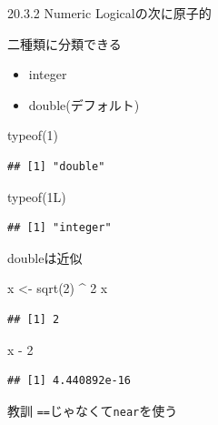 \documentclass[
  ignorenonframetext,
]{beamer}
\newenvironment{Shaded}{\begin{snugshade}}{\end{snugshade}}
\newcommand{\DecValTok}[1]{\textcolor[rgb]{0.00,0.00,0.81}{#1}}
\newcommand{\FunctionTok}[1]{\textcolor[rgb]{0.00,0.00,0.00}{#1}}
\newcommand{\NormalTok}[1]{#1}
\newcommand{\OtherTok}[1]{\textcolor[rgb]{0.56,0.35,0.01}{#1}}
\newcommand{\SpecialCharTok}[1]{\textcolor[rgb]{0.00,0.00,0.00}{#1}}
\providecommand{\tightlist}{%
  \setlength{\itemsep}{0pt}\setlength{\parskip}{0pt}}
\begin{document}
\begin{frame}[fragile]{20.3.2 Numeric}
\protect\hypertarget{numeric}{}
Logicalの次に原子的

二種類に分類できる

\begin{itemize}
\tightlist
\item
  integer
\item
  double(デフォルト)
\end{itemize}

\begin{Shaded}
\begin{Highlighting}[]
\FunctionTok{typeof}\NormalTok{(}\DecValTok{1}\NormalTok{)}
\end{Highlighting}
\end{Shaded}

\begin{verbatim}
## [1] "double"
\end{verbatim}

\begin{Shaded}
\begin{Highlighting}[]
\FunctionTok{typeof}\NormalTok{(1L)}
\end{Highlighting}
\end{Shaded}

\begin{verbatim}
## [1] "integer"
\end{verbatim}
\end{frame}

\begin{frame}[fragile]{doubleは近似}
\protect\hypertarget{doubleux306fux8fd1ux4f3c}{}
\begin{Shaded}
\begin{Highlighting}[]
\NormalTok{x }\OtherTok{\textless{}{-}} \FunctionTok{sqrt}\NormalTok{(}\DecValTok{2}\NormalTok{) }\SpecialCharTok{\^{}} \DecValTok{2}
\NormalTok{x}
\end{Highlighting}
\end{Shaded}

\begin{verbatim}
## [1] 2
\end{verbatim}

\begin{Shaded}
\begin{Highlighting}[]
\NormalTok{x }\SpecialCharTok{{-}} \DecValTok{2}
\end{Highlighting}
\end{Shaded}

\begin{verbatim}
## [1] 4.440892e-16
\end{verbatim}

\begin{block}{教訓}
\protect\hypertarget{ux6559ux8a13}{}
\texttt{==}じゃなくて\texttt{near}を使う
\end{block}
\end{frame}
\end{document}
